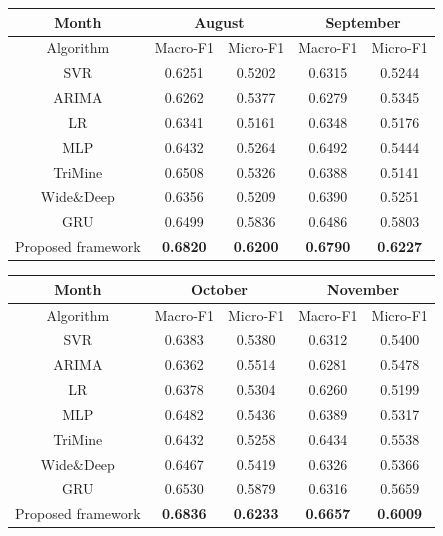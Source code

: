 \begin{table}
    \centering
    \begin{tabular}{c|c|c|c|c}
        \toprule
        Month & \multicolumn{2}{|c|}{August} & \multicolumn{2}{|c}{September}\\[0.1cm]
        \hline
        Algorithm & Macro-F1 & Micro-F1    & Macro-F1 & Micro-F1 \\[0.1cm]
        \hline
        SVR & 0.6251 & 0.5202 & 0.6315 & 0.5244\\[0.1cm]
        ARIMA & 0.6262 & 0.5377 & 0.6279 & 0.5345 \\[0.1cm]
        LR & 0.6341 & 0.5161 & 0.6348 & 0.5176\\[0.1cm]
        MLP & 0.6432 & 0.5264 & 0.6492 & 0.5444\\[0.1cm]
        TriMine & 0.6508 & 0.5326 & 0.6388 & 0.5141\\[0.1cm]
        Wide\&Deep & 0.6356 & 0.5209 & 0.6390 & 0.5251\\[0.1cm]
        GRU & 0.6499 & 0.5836 & 0.6486 & 0.5803\\[0.1cm]
        \toprule
        Proposed framework & \bf 0.6820 & \bf 0.6200 & \bf 0.6790 & \bf 0.6227\\
        \bottomrule
    \end{tabular}

    \vspace{0.1cm}

    \begin{tabular}{c|c|c|c|c}
        \toprule
        Month & \multicolumn{2}{|c|}{October} & \multicolumn{2}{|c}{November}\\[0.1cm]
        \hline
        Algorithm & Macro-F1 & Micro-F1    & Macro-F1 & Micro-F1 \\[0.1cm]
        \hline
        SVR & 0.6383 & 0.5380 & 0.6312 & 0.5400\\[0.1cm]
        ARIMA & 0.6362 & 0.5514 & 0.6281 & 0.5478\\[0.1cm]
        LR & 0.6378 & 0.5304 & 0.6260 & 0.5199\\[0.1cm]
        MLP & 0.6482 & 0.5436 & 0.6389 & 0.5317\\[0.1cm]
        TriMine & 0.6432 & 0.5258 & 0.6434 & 0.5538\\[0.1cm]
        Wide\&Deep & 0.6467 & 0.5419 & 0.6326 & 0.5366\\[0.1cm]
        GRU & 0.6530 & 0.5879 & 0.6316 & 0.5659\\[0.1cm]
        \toprule
        Proposed framework & \bf 0.6836 & \bf 0.6233 & \bf 0.6657 & \bf 0.6009\\
        \bottomrule
    \end{tabular}


\end{table}
